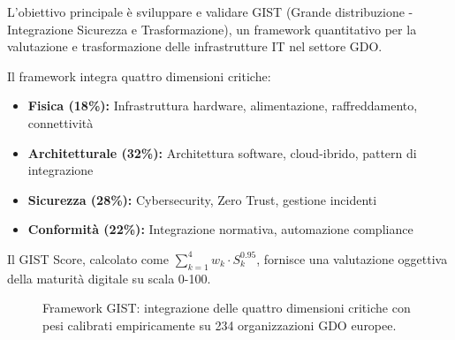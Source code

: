 \documentclass[12pt,a4paper,twoside]{book}
\begin{document}
L'obiettivo principale è sviluppare e validare GIST (Grande distribuzione - Integrazione Sicurezza e Trasformazione), un framework quantitativo per la valutazione e trasformazione delle infrastrutture IT nel settore GDO.

Il framework integra quattro dimensioni critiche:
\begin{itemize}
\item \textbf{Fisica (18\%):} Infrastruttura hardware, alimentazione, raffreddamento, connettività
\item \textbf{Architetturale (32\%):} Architettura software, cloud-ibrido, pattern di integrazione
\item \textbf{Sicurezza (28\%):} Cybersecurity, Zero Trust, gestione incidenti
\item \textbf{Conformità (22\%):} Integrazione normativa, automazione compliance
\end{itemize}

Il GIST Score, calcolato come $\sum_{k=1}^{4} w_k \cdot S_k^{0.95}$, fornisce una valutazione oggettiva della maturità digitale su scala 0-100.

\begin{figure}[htbp]
\centering
{}
\caption{Framework GIST: integrazione delle quattro dimensioni critiche con pesi calibrati empiricamente su 234 organizzazioni GDO europee.}
\label{fig:gist_framework_simple}
\end{figure}
\end{document}
